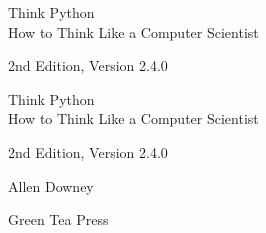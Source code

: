 \documentclass[10pt]{book}
\newcommand{\theversion}{2nd Edition, Version 2.4.0}
\newcommand{\thedate}{}
\begin{document}
\begin{latexonly}

\renewcommand{\blankpage}{\thispagestyle{empty} \quad \newpage}



\thispagestyle{empty}

\begin{flushright}
\vspace*{2.0in}

\begin{spacing}{3}
{\huge Think Python}\\
{\Large How to Think Like a Computer Scientist}
\end{spacing}

\vspace{0.25in}

\theversion

\thedate

\vfill

\end{flushright}


\blankpage
\blankpage

\pagebreak
\thispagestyle{empty}

\begin{flushright}
\vspace*{2.0in}

\begin{spacing}{3}
{\huge Think Python}\\
{\Large How to Think Like a Computer Scientist}
\end{spacing}

\vspace{0.25in}

\theversion

\thedate

\vspace{1in}


{\Large
Allen Downey\\
}


\vspace{0.5in}

{\Large Green Tea Press}


\end{flushright}
\end{latexonly}
\end{document}
